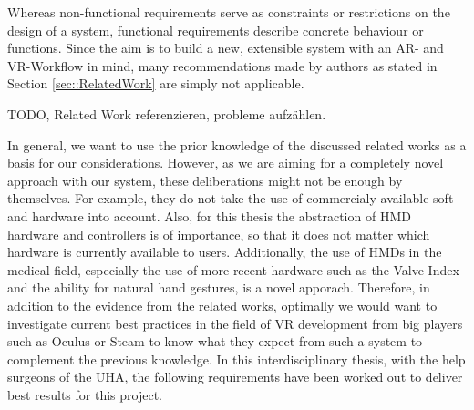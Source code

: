 Whereas non-functional requirements serve as constraints or restrictions on the design of a system, functional requirements describe concrete behaviour or functions.
Since the aim is to build a new, extensible system with an AR- and VR-Workflow in mind, many recommendations made by authors as stated in Section \ref{sec::RelatedWork} are simply not applicable.

TODO, Related Work referenzieren, probleme aufzählen.

In general, we want to use the prior knowledge of the discussed related works as a basis for our considerations. However, as we are aiming for a completely novel approach with our system, these deliberations might not be enough by themselves.
For example, they do not take the use of commercialy available soft- and hardware into account.
Also, for this thesis the abstraction of HMD hardware and controllers is of importance, so that it does not matter which hardware is currently available to users.
Additionally, the use of HMDs in the medical field, especially the use of more recent hardware such as the Valve Index and the ability for natural hand gestures, is a novel apporach.
Therefore, in addition to the evidence from the related works, optimally we would want to investigate current best practices in the field of VR development from big players such as Oculus or Steam to know what they expect from such a system to complement the previous knowledge.
In this interdisciplinary thesis, with the help surgeons of the UHA, the following requirements have been worked out to deliver best results for this project. 

